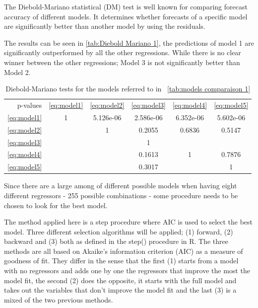\documentclass[12pt,a4paper,oneside]{book}
\begin{document}

The Diebold-Mariano statistical (DM) test \citep{diebold_comparing_1995} is well known for comparing forecast accuracy of different models. 
It determines whether forecasts of a specific model are significantly better than another model by using the residuals.


The results can be seen in \autoref{tab:Diebold Mariano 1}, the predictions of model 1 are significantly outperformed by all the other regressions. While there is no clear winner between the other regressions; Model 3 is not significantly better than Model 2.


\begin{table}[H]
    \caption{Diebold-Mariano tests for the models referred to in \ \autoref{tab:models comparaison 1} }
    \label{tab:Diebold Mariano 1}
     \centering \footnotesize
    \begin{tabular}{| r | c c c c c |}
    \cline{2-6}
 \multicolumn{0}{r|}{p-values}	& \ref{eq:model1} & \ref{eq:model2} & \ref{eq:model3} & \ref{eq:model4} & \ref{eq:model5} \\ \cline{1-6}
 \ref{eq:model1} & 1 & 5.126e-06 & 2.586e-06 & 6.352e-06 & 5.602e-06\\ 
 \ref{eq:model2} &   & 1  & 0.2055 & 0.6836 & 0.5147 \\
 \ref{eq:model3} &   &   & 1 & &   \\
 \ref{eq:model4} &   &   &  0.1613 & 1 & 0.7876 \\
 \ref{eq:model5} &   &   & 0.3017 &   & 1 \\ \cline{1-6}
\end{tabular}
\end{table}




Since there are a large among of different possible models when having eight different regressors - 255 possible combinations - some procedure needs to be chosen to look for the best model.

The method applied here is a step procedure where AIC is used to select the best model.
Three different selection algorithms will be applied; (1) forward, (2) backward and (3) both as defined in the step() procedure in R. 
The three methods are all based on Akaike's information criterion (AIC) as a measure of goodness of fit. They differ in the sense that the first (1) starts from a model with no regressors and adds one by one the regressors that improve the most the model fit, the second (2) does the opposite, it starts with the full model and takes out the variables that don't improve the model fit and the last (3) is a mixed of the two previous methods.
\end{document}
